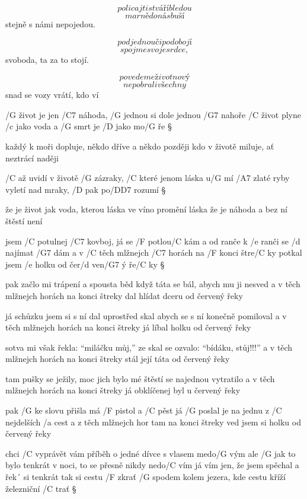 \[ policajti s tváří bledou \]
\[ marně do nás buší \]
stejně s námi nepojedou. \s

\[ pod jednou či podobojí \]
\[ spojme svoje srdce, \]
svoboda, ta za to stojí. \s

\[ povedeme život nový \]
\[ nepobrali všechny \]
snad se vozy vrátí, kdo ví \s




/G život je jen /C7 náhoda, /G jednou si dole jednou /G7 nahoře
/C život plyne /c jako voda a /G smrt je /D jako mo/G ře \S

každý k moři dopluje, někdo dříve a někdo později
kdo v životě miluje, ať neztrácí naději \s

/C až uvidí v životě /G zázraky, /C které jenom láska u/G mí
/A7 zlaté ryby vyletí nad mraky, /D pak po/{D\dim D7} rozumí \S

že je život jak voda, kterou láska ve víno promění
láska že je náhoda a bez ní štěstí není




jsem /C potulnej /C7 kovboj, já se /F potlou/C kám
a od ranče k /e ranči se /d najímat /G7 dám
a v /C těch mlžnejch /C7 horách na /F konci štre/C ky
potkal jsem /e holku od čer/d ven/G7 ý ře/C ky \S

pak začlo mi trápení a spousta běd
když táta se bál, abych mu ji nesved
a v těch mlžnejch horách na konci štreky
dal hlídat dceru od červený řeky \s

já schůzku jsem si s ní dal uprostřed skal
abych se s ní konečně pomiloval
a v těch mlžnejch horách na konci štreky
já líbal holku od červený řeky \s

sotva mi však řekla: ``miláčku můj,''
ze skal se ozvalo: ``bídáku, stůj!!!''
a v těch mlžnejch horách na konci štreky
stál její táta od červený řeky \s

tam pušky se ježily, moc jich bylo
mé štěstí se najednou vytratilo
a v těch mlžnejch horách na konci štreky
já obklíčenej byl u červený řeky \s

pak /G ke slovu přišla má /F pistol a /C pěst
já /G poslal je na jednu z /C nejdelších /a cest
a z těch mlžnejch hor tam na konci štreky
ved jsem si holku od červený řeky




chci /C vyprávět vám příběh o jedné dívce s vlasem medo/G vým
ale /G jak to bylo tenkrát v noci, to se přesně nikdy nedo/C vím
já vím jen, že jsem spěchal a řek´ si tenkrát tak si cestu /F zkrať
/G spodem kolem jezera, kde cestu kříží železniční /C trať \S

